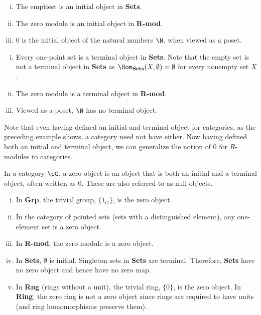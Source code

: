 \begin{ex} \hfill
	\begin{enumerate}[(i)]
	\item The emptiest is an initial object in \textbf{Sets}.
	\item The zero module is an initial object in \textbf{R-mod}. 
	\item 0 is the initial object of the natural numbers $\N$, when viewed as a poset. 
	\end{enumerate} \xqed 
\end{ex}


\begin{ex} \hfill
	\begin{enumerate}[(i)]
	\item Every one-point set is a terminal object in \textbf{Sets}. Note that the empty set is not a terminal object in \textbf{Sets} as $\Hom_{\textbf{Sets}}(X,\emptyset)=\emptyset$ for every nonempty set $X$.
	\item The zero module is a terminal object in \textbf{R-mod}.
	\item Viewed as a poset, $\N$ has no terminal object. 
	\end{enumerate} \xqed
\end{ex}


\noindent Note that even having defined an initial and terminal object for categories, as the preceding example shows, a category need not have either. Now having defined both an initial and terminal object, we can generalize the notion of 0 for $R$-modules to categories. 


\begin{dfn}
In a category $\cC$, a zero object is an object that is both an initial and a terminal object, often written as 0. These are also referred to as null objects. 
\end{dfn}


\begin{ex} \hfill
	\begin{enumerate}[(i)]
	\item In \textbf{Grp}, the trivial group, $\{1_G\}$, is the zero object. 
	\item In the category of pointed sets (sets with a distinguished element), any one-element set is a zero object. 
	\item In \textbf{R-mod}, the zero module is a zero object. 
	\item In \textbf{Sets}, $\emptyset$ is initial. Singleton sets in \textbf{Sets} are terminal. Therefore, \textbf{Sets} have no zero object and hence have no zero map. 
	\item In \textbf{Rng} (rings without a unit), the trivial ring, $\{0\}$, is the zero object. In \textbf{Ring}, the zero ring is not a zero object since rings are required to have units (and ring homomorphisms preserve them). 
	\end{enumerate} \xqed
\end{ex}



